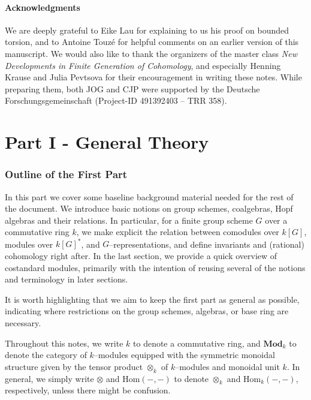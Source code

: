 \documentclass{article}
\theoremstyle{plain}
\theoremstyle{definition}
\begin{document}
\subsection*{Acknowledgments} 
We are deeply grateful to Eike Lau for explaining to us his proof on bounded torsion, and to Antoine Touz\'e for  helpful comments on an earlier version of this manuscript. We would also like to thank the organizers of the master class \textit{New Developments in Finite Generation of Cohomology}, and especially Henning Krause and Julia Pevtsova for their encouragement in writing these notes. While preparing them, both  JOG and CJP were   supported   by the Deutsche Forschungsgemeinschaft (Project-ID 491392403 – TRR 358).

\pagebreak

\part*{Part I - General Theory}\label{part I}

\section{Outline of the First Part}


In this part we cover some baseline background material needed for the rest of the document. We introduce basic notions on group schemes, coalgebras, Hopf algebras and their relations. In particular, for a finite group scheme $G$ over a commutative ring $k$, we  make explicit the relation between comodules over  $k[G]$, modules over $k[G]^\ast$, and $G$--representations, and define invariants and (rational) cohomology right after.  In the last section, we provide a quick overview of costandard modules, primarily with the intention of reusing several of the notions and terminology in later sections.

It is worth highlighting that we aim to keep the first part as general as possible, indicating where restrictions on the group schemes, algebras, or base ring are necessary.

Throughout this notes, we write $k$ to denote a commutative ring, and $\textbf{Mod}_k$ to denote the category of $k$--modules equipped with the symmetric monoidal structure given by the tensor product $\otimes_k$ of $k$--modules and monoidal unit $k$. In general, we simply write $\otimes$ and $\mathrm{Hom}(-,-)$ to denote $\otimes_k$ and $\mathrm{Hom}_k(-,-)$, respectively, unless there might be confusion.
\end{document}
